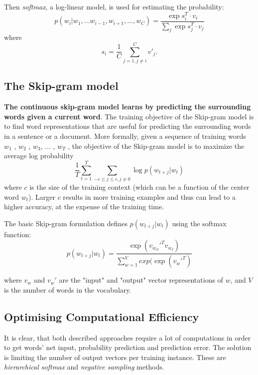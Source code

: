 \documentclass[conference, ]{IEEEtran}
\renewcommand{\le}{\leqslant}
\begin{document}
	Then \textit{softmax}, a log-linear model, is used for 
	estimating the probability:
	\[
	p(w_i|w_1,\ldots w_{i-1}, w_{i+1},\ldots, w_C) = 
	\frac{\exp s^T_i\cdot v_i}{\sum_j\exp s^T_j\cdot v_j}
	\]where
	\[
	s_i = \frac{1}{C}\sum_{j=1, j\neq i}^{C}v'_j.
	\]
	
	
	
	
	
	
	
	
	
	\subsection*{The Skip-gram model}
	\textbf{The continuous skip-gram model learns by predicting the surrounding words given a current word}.
	The training objective of the Skip-gram model is to find word representations that are useful for
	predicting the surrounding words in a sentence or a document. More formally, given a sequence of
	training words $w_1$ , $w_2$ , $w_3$, $\dots$ , $w_T$ , the objective of the Skip-gram model is to maximize the average
	log probability
	\[
	\frac{1}{T}\sum_{t=1}^{T}\sum_{-c\le j\le c, j\neq 0} \log p(w_{t+j}|w_t)
	\]
	where $c$ is the size of the training context (which can be a function of the center word $w_t$). Larger
	$c$ results in more training examples and thus can lead to a higher accuracy, at the expense of the training time.
	
	The basic Skip-gram formulation defines $p(w_{t+j}|w_t)$ using the softmax function:
	\[
	p(w_{t+j}|w_t)=\frac{\exp(v_{w_O}'^T v_{w_I})}{\sum_{w=1}^{V}exp(\exp(v_{w}'^T)}
	\]

	where $v_w$ and $v_w'$
	are the "input" and "output" vector representations of $w$, and $V$ is the number of words in the vocabulary.
	
	 \cite{mikolov1}
	 
	\subsection*{Optimising Computational Efficiency}
	It is clear, that both described approaches require a lot of computations in order to get words' net input, probability prediction and prediction error. The solution is limiting the number of output vectors per training instance. These are \textit{hierarchical softmax} and \textit{negative sampling} methods.
	
\end{document}

